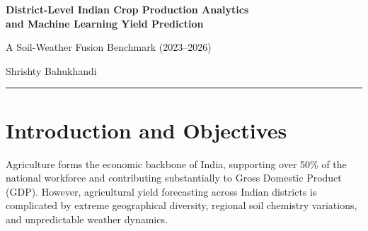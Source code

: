 \documentclass[11pt,a4paper]{article}
\begin{document}
\begin{center}
    {\LARGE \bfseries District-Level Indian Crop Production Analytics\\ and Machine Learning Yield Prediction \par}
    \vspace{0.3cm}
    {\large A Soil-Weather Fusion Benchmark (2023--2026) \par}
    \vspace{0.5cm}
    {\large Shrishty Bahukhandi \par}
    \vspace{0.3cm}
    \rule{\linewidth}{0.8pt}
\end{center}

\begin{abstract}
Predicting district-level agricultural crop production across diverse ecological zones in India is vital for national food security and economic planning. Existing research studies published between 2023 and 2026 suffer from state-level aggregation bias, omission of soil chemical attributes (Nitrogen, Phosphorus, Potassium, Soil pH, and Organic Carbon), or restriction to single-crop models. In this work, we present a custom processed dataset comprising \textbf{27,303 district-crop records} spanning \textbf{475 districts}, \textbf{29 states}, and \textbf{19 major crops} across multiple crop years (2021--2024). We propose a unified machine learning framework integrating soil nutrient vectors, micro-climate weather parameters, and spatial administrative encodings. We benchmark eight machine learning models ranging from baseline regressors to tuned gradient boosting architectures. LightGBM and XGBoost achieved top performance with $R^2$ scores of 0.9312 and 0.9287, and RMSE of 0.5765 and 0.5862 thousand metric tonnes, respectively. The full system is deployed as an interactive web dashboard with real-time prediction APIs.
\end{abstract}

\vspace{0.3cm}

\section{Introduction and Objectives}
\label{sec:intro}

Agriculture forms the economic backbone of India, supporting over 50\% of the national workforce and contributing substantially to Gross Domestic Product (GDP). However, agricultural yield forecasting across Indian districts is complicated by extreme geographical diversity, regional soil chemistry variations, and unpredictable weather dynamics.
\end{document}
